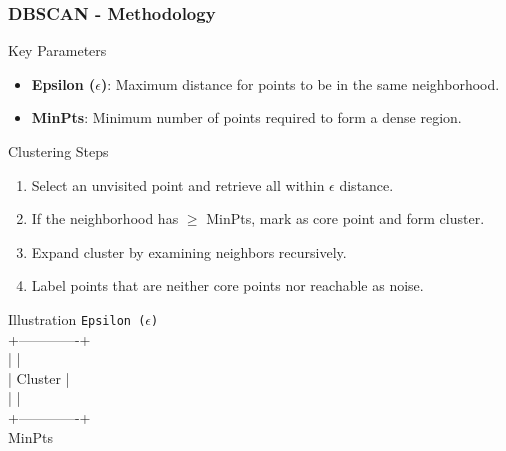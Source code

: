 \documentclass[aspectratio=169]{beamer}
\begin{document}
\begin{frame}[fragile]
    \frametitle{DBSCAN - Methodology}
    \begin{block}{Key Parameters}
        \begin{itemize}
            \item \textbf{Epsilon ($\epsilon$)}: Maximum distance for points to be in the same neighborhood.
            \item \textbf{MinPts}: Minimum number of points required to form a dense region.
        \end{itemize}
    \end{block}
    
    \begin{block}{Clustering Steps}
        \begin{enumerate}
            \item Select an unvisited point and retrieve all within $\epsilon$ distance.
            \item If the neighborhood has $\geq$ MinPts, mark as core point and form cluster.
            \item Expand cluster by examining neighbors recursively.
            \item Label points that are neither core points nor reachable as noise.
        \end{enumerate}
    \end{block}
    
    \begin{block}{Illustration}
        \centering
        \texttt{Epsilon ($\epsilon$)}\\
        +-------------+\\
        |             |\\
        |   Cluster   |\\
        |             |\\
        +-------------+\\
        MinPts
    \end{block}
\end{frame}
\end{document}
